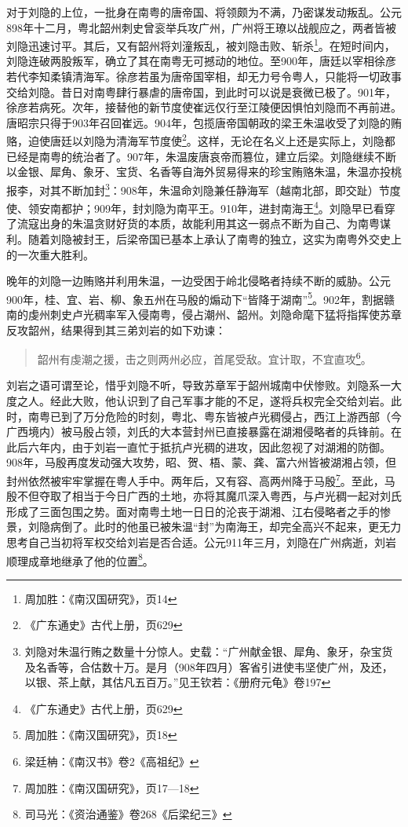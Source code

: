 对于刘隐的上位，一批身在南粤的唐帝国、将领颇为不满，乃密谋发动叛乱。公元898年十二月，粤北韶州刺史曾衮举兵攻广州，广州将王璙以战舰应之，两者皆被刘隐迅速讨平。其后，又有韶州将刘潼叛乱，被刘隐击败、斩杀\footnote{周加胜：《南汉国研究》，页14}。在短时间内，刘隐连破两股叛军，确立了其在南粤无可撼动的地位。至900年，唐廷以宰相徐彦若代李知柔镇清海军。徐彦若虽为唐帝国宰相，却无力号令粤人，只能将一切政事交给刘隐。昔日对南粤肆行暴虐的唐帝国，到此时可以说是衰微已极了。901年，徐彦若病死。次年，接替他的新节度使崔远仅行至江陵便因惧怕刘隐而不再前进。唐昭宗只得于903年召回崔远。904年，包揽唐帝国朝政的梁王朱温收受了刘隐的贿赂，迫使唐廷以刘隐为清海军节度使\footnote{《广东通史》古代上册，页629}。这样，无论在名义上还是实际上，刘隐都已经是南粤的统治者了。907年，朱温废唐哀帝而篡位，建立后梁。刘隐继续不断以金银、犀角、象牙、宝货、名香等自海外贸易得来的珍宝贿赂朱温，朱温亦投桃报李，对其不断加封\footnote{刘隐对朱温行贿之数量十分惊人。史载：“广州献金银、犀角、象牙，杂宝货及名香等，合估数十万。是月（908年四月）客省引进使韦坚使广州，及还，以银、茶上献，其估凡五百万。”见王钦若：《册府元龟》卷197}：908年，朱温命刘隐兼任静海军（越南北部，即交趾）节度使、领安南都护；909年，封刘隐为南平王。910年，进封南海王\footnote{《广东通史》古代上册，页629}。刘隐早已看穿了流寇出身的朱温贪财好货的本质，故能利用其这一弱点不断为自己、为南粤谋利。随着刘隐被封王，后梁帝国已基本上承认了南粤的独立，这实为南粤外交史上的一次重大胜利。

晚年的刘隐一边贿赂并利用朱温，一边受困于岭北侵略者持续不断的威胁。公元900年，桂、宜、岩、柳、象五州在马殷的煽动下“皆降于湖南”\footnote{周加胜：《南汉国研究》，页18}。902年，割据赣南的虔州刺史卢光稠率军入侵南粤，侵占潮州、韶州。刘隐命麾下猛将指挥使苏章反攻韶州，结果得到其三弟刘岩的如下劝谏：

\begin{quote}

韶州有虔潮之援，击之则两州必应，首尾受敌。宜计取，不宜直攻\footnote{梁廷柟：《南汉书》卷2《高祖纪》}。

\end{quote}

刘岩之语可谓至论，惜乎刘隐不听，导致苏章军于韶州城南中伏惨败。刘隐系一大度之人。经此大败，他认识到了自己军事才能的不足，遂将兵权完全交给刘岩。此时，南粤已到了万分危险的时刻，粤北、粤东皆被卢光稠侵占，西江上游西部（今广西境内）被马殷占领，刘氏的大本营封州已直接暴露在湖湘侵略者的兵锋前。在此后六年内，由于刘岩一直忙于抵抗卢光稠的进攻，因此忽视了对湖湘的防御。908年，马殷再度发动强大攻势，昭、贺、梧、蒙、龚、富六州皆被湖湘占领，但封州依然被牢牢掌握在粤人手中。两年后，又有容、高两州降于马殷\footnote{周加胜：《南汉国研究》，页17—18}。至此，马殷不但夺取了相当于今日广西的土地，亦将其魔爪深入粤西，与卢光稠一起对刘氏形成了三面包围之势。面对南粤土地一日日的沦丧于湖湘、江右侵略者之手的惨景，刘隐病倒了。此时的他虽已被朱温“封”为南海王，却完全高兴不起来，更无力思考自己当初将军权交给刘岩是否合适。公元911年三月，刘隐在广州病逝，刘岩顺理成章地继承了他的位置\footnote{司马光：《资治通鉴》卷268《后梁纪三》}。

